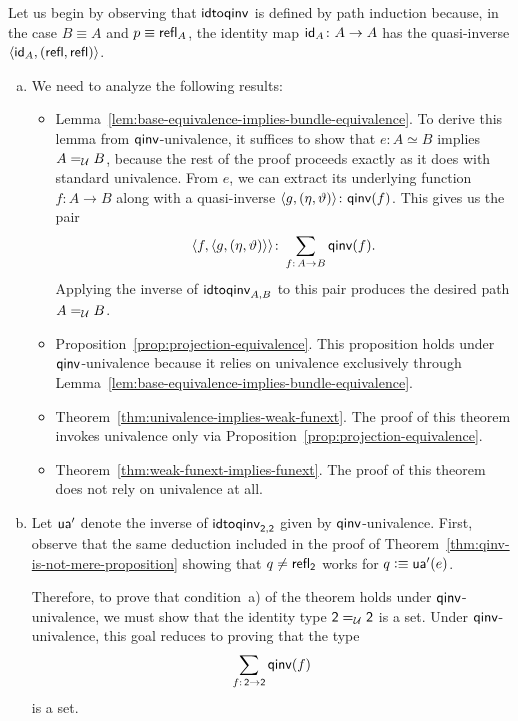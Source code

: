 \begin{solution}
    Let us begin by observing that $\mathsf{idtoqinv}$ is defined by path induction because, in the case $B\equiv A$ and $p\equiv\mathsf{refl}_A$, the identity map $\id_A\colon A\to A$ has the quasi-inverse $\langle\mathsf{id}_A,(\mathsf{refl},\mathsf{refl})\rangle$.

    \begin{enumerate}[a)]
        \item We need to analyze the following results:
        \begin{itemize}
            \item Lemma~\ref{lem:base-equivalence-implies-bundle-equivalence}. To derive this lemma from $\mathsf{qinv}$-univalence, it suffices to show that $e\colon A\simeq B$ implies $A\mathrel{=_{\mathcal U}} B$, because the rest of the proof proceeds exactly as it does with standard univalence. From $e$, we can extract its underlying function $f\colon A\to B$ along with a quasi-inverse $\dep{g,(\eta,\vartheta)}\colon\fun{qinv}(f)$. This gives us the pair
            \[
                \dep{f,\dep{g,(\eta,\vartheta)}}
                \colon\sum_{f\colon A\to B}\fun{qinv}(f).
            \]
            Applying the inverse of $\mathsf{idtoqinv}_{A,B}$ to this pair produces the desired path $A\mathrel{=_{\mathcal U}} B$.
            
            \item Proposition~\ref{prop:projection-equivalence}. This proposition holds under $\mathsf{qinv}$-univalence because it relies on univalence exclusively through Lemma~\ref{lem:base-equivalence-implies-bundle-equivalence}.
            
            \item Theorem~\ref{thm:univalence-implies-weak-funext}. The proof of this theorem invokes univalence only via Proposition~\ref{prop:projection-equivalence}.
            
            \item Theorem~\ref{thm:weak-funext-implies-funext}. The proof of this theorem does not rely on univalence at all.
        \end{itemize}

        \item Let $\mathsf{ua'}$ denote the inverse of $\mathsf{idtoqinv}_{\mathsf{2},\mathsf{2}}$ given by $\mathsf{qinv}$-univalence. First, observe that the same deduction included in the proof of Theorem~\ref{thm:qinv-is-not-mere-proposition} showing that $q\ne\mathsf{refl}_{\mathsf{2}}$ works for $q\mathrel{\vcentcolon}\equiv\mathsf{ua'}(e)$.
        
        Therefore, to prove that condition~a) of the theorem holds under $\mathsf{qinv}$-univalence, we must show that the identity type $\mathsf{2}\mathrel{=_{\mathcal U}}\mathsf{2}$ is a set. Under $\mathsf{qinv}$-univalence, this goal reduces to proving that the type
        \[
            \sum_{f\colon\fun2\to\fun2}\fun{qinv}(f)
        \]
        is a set.
        

\end{enumerate}
\end{solution}
